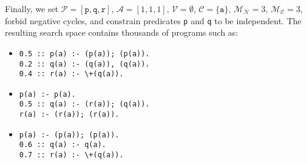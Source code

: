 \documentclass[runningheads]{llncs}
\newcommand{\predicates}{\mathcal{P}}
\newcommand{\variables}{\mathcal{V}}
\newcommand{\constants}{\mathcal{C}}
\newcommand{\arities}{\mathcal{A}}
\newcommand{\maxNumNodes}{\mathcal{M}_{\mathcal{N}}}
\newcommand{\maxNumClauses}{\mathcal{M}_{\mathcal{C}}}
\begin{document}
Finally, we set
$\predicates{} = [\texttt{p}, \texttt{q}, \texttt{r}]$, $\arities{} = [1, 1,
1]$, $\variables{} = \emptyset$, $\constants{} = \{ \texttt{a} \}$,
$\maxNumNodes{} = 3$, $\maxNumClauses{} = 3$, forbid negative cycles, and
constrain predicates \texttt{p} and \texttt{q} to be independent. The resulting
search space contains thousands of programs such as:

\begin{itemize}
\item
\begin{verbatim}
0.5 :: p(a) :- (p(a)); (p(a)).
0.2 :: q(a) :- (q(a)), (q(a)).
0.4 :: r(a) :- \+(q(a)).
\end{verbatim}
\item
\begin{verbatim}
p(a) :- p(a).
0.5 :: q(a) :- (r(a)); (q(a)).
r(a) :- (r(a)); (r(a)).
\end{verbatim}
\item
\begin{verbatim}
p(a) :- (p(a)); (p(a)).
0.6 :: q(a) :- q(a).
0.7 :: r(a) :- \+(q(a)).
\end{verbatim}
\end{itemize}



\end{document}

